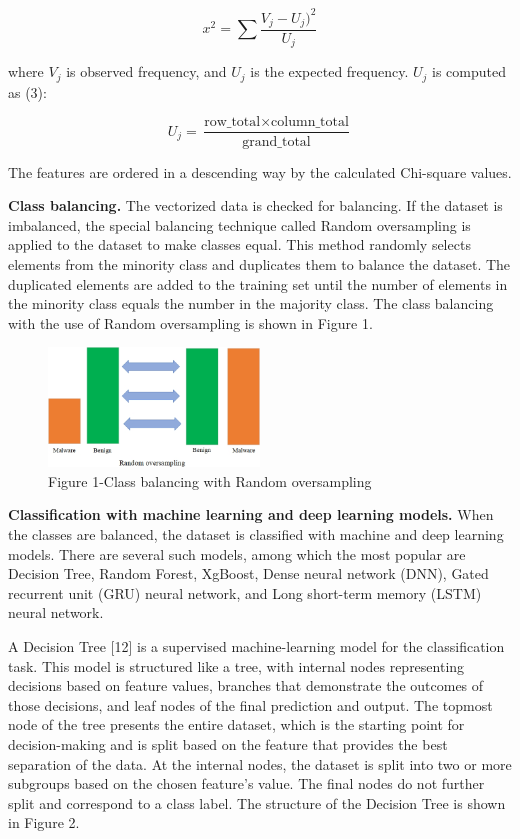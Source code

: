 \begin{multicols}{2}
\begin{equation}
x^2=\sum\frac{V_j-U_j)^2}{U_j}
\end{equation}


where $V_j$ is observed frequency, and $U_j$ is the expected frequency. $U_j$ is computed as (3):

\begin{equation}
U_j = \frac{\text{row\_total} \times \text{column\_total}}{\text{grand\_total}}
\end{equation}

The features are ordered in a descending way by the calculated
Chi-square values.

{\bfseries Class balancing.} The vectorized data is checked for balancing.
If the dataset is imbalanced, the special balancing technique called
Random oversampling is applied to the dataset to make classes equal.
This method randomly selects elements from the minority class and
duplicates them to balance the dataset. The duplicated elements are
added to the training set until the number of elements in the minority
class equals the number in the majority class. The class balancing with
the use of Random oversampling is shown in Figure 1.
\end{multicols}

\begin{figure}[H]
	\centering
	\includegraphics[width=0.5\textwidth]{media/ict/image38}
	\caption*{Figure 1-Class balancing with Random oversampling}
\end{figure}

\begin{multicols}{2}
{\bfseries Classification with machine learning and deep learning models.}
When the classes are balanced, the dataset is classified with machine
and deep learning models. There are several such models, among which the
most popular are Decision Tree, Random Forest, XgBoost, Dense neural
network (DNN), Gated recurrent unit (GRU) neural network, and Long
short-term memory (LSTM) neural network.

A Decision Tree {[}12{]} is a supervised machine-learning model for the
classification task. This model is structured like a tree, with internal
nodes representing decisions based on feature values, branches that
demonstrate the outcomes of those decisions, and leaf nodes of the final
prediction and output. The topmost node of the tree presents the entire
dataset, which is the starting point for decision-making and is split
based on the feature that provides the best separation of the data. At
the internal nodes, the dataset is split into two or more subgroups
based on the chosen feature's value. The final nodes do not further
split and correspond to a class label. The structure of the Decision
Tree is shown in Figure 2.
\end{multicols}


